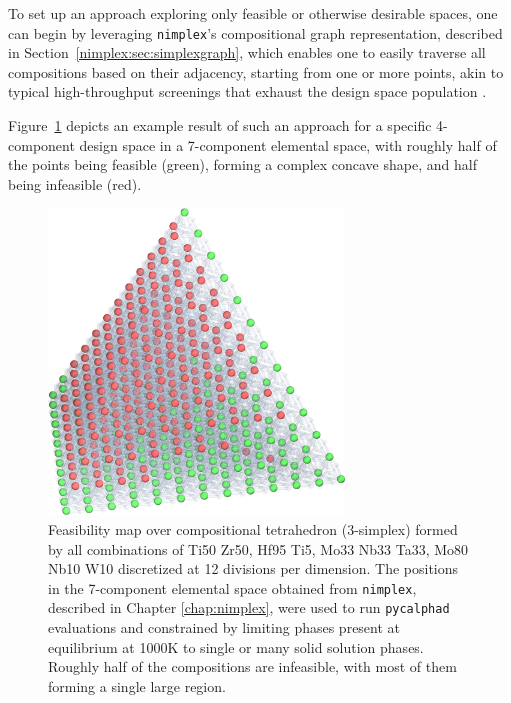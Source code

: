 To set up an approach exploring only feasible or otherwise desirable spaces, one can begin by leveraging \texttt{nimplex}'s compositional graph representation, described in Section~\ref{nimplex:sec:simplexgraph}, which enables one to easily traverse all compositions based on their adjacency, starting from one or more points, akin to typical high-throughput screenings that exhaust the design space population \cite{Feng2021High-throughputAlloys, Wang2023SearchingExperiments, Yang2022AHardness, Maresca2020Mechanistic1900K}.

Figure~\ref{infeasibilitygliding:fig:fullcomputation} depicts an example result of such an approach for a specific 4-component design space in a 7-component elemental space, with roughly half of the points being feasible (green), forming a complex concave shape, and half being infeasible (red).

\begin{figure}[H]
    \centering
    \includegraphics[width=0.7\textwidth]{infeasibilitygliding/InfeasibilityGliding_Full.jpeg}
    \caption{Feasibility map over compositional tetrahedron (3-simplex) formed by all combinations of Ti50 Zr50, Hf95 Ti5, Mo33 Nb33 Ta33, Mo80 Nb10 W10 discretized at 12 divisions per dimension. The positions in the 7-component elemental space obtained from \texttt{nimplex}, described in Chapter \ref{chap:nimplex}, were used to run \texttt{pycalphad} \cite{Otis2017Pycalphad:Python} evaluations and constrained by limiting phases present at equilibrium at 1000K to single or many solid solution phases. Roughly half of the compositions are infeasible, with most of them forming a single large region.}
    \label{infeasibilitygliding:fig:fullcomputation}
\end{figure}

